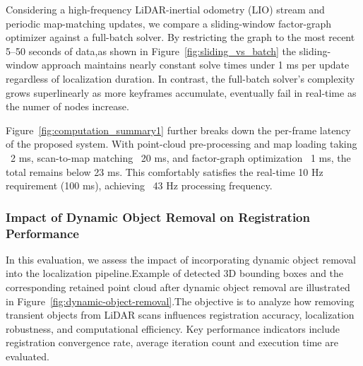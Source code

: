 Considering a high-frequency LiDAR-inertial odometry (LIO) stream and periodic map-matching updates, we compare a sliding-window factor-graph optimizer against a full-batch solver. By restricting the graph to the most recent 5–50 seconds of data,as shown in Figure~\ref{fig:sliding_vs_batch} the sliding-window approach maintains nearly constant solve times under 1 ms per update regardless of localization duration. In contrast, the full-batch solver’s complexity grows superlinearly as more keyframes accumulate, eventually fail in real‐time as the numer of nodes increase.

Figure~\ref{fig:computation_summary1} further breaks down the per-frame latency of the proposed system. With point-cloud pre-processing and map loading taking ~2 ms, scan-to-map matching ~20 ms, and factor-graph optimization ~1 ms, the total remains below 23 ms. This comfortably satisfies the real-time 10 Hz requirement (100 ms), achieving ~43 Hz processing frequency.



\subsubsection{Impact of Dynamic Object Removal on Registration Performance}

In this evaluation, we assess the impact of incorporating dynamic object removal into the localization pipeline.Example of  detected 3D bounding boxes and the corresponding retained point cloud after dynamic object removal are illustrated in Figure~\ref{fig:dynamic-object-removal}.The objective is to analyze how removing transient objects from LiDAR scans influences registration accuracy, localization robustness, and computational efficiency. Key performance indicators include registration convergence rate, average iteration count and  execution time are evaluated.

